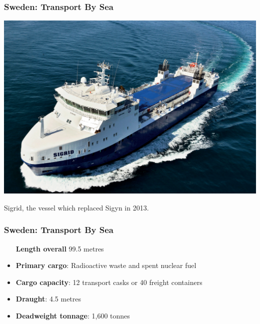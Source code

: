 \begin{frame}[c]
\frametitle{Sweden: Transport By Sea}

\includegraphics[height=0.9\textheight]{./images/sweden-sigrid}


Sigrid, the vessel which replaced Sigyn in 2013.

\end{frame}

\begin{frame}[c]
\frametitle{Sweden: Transport By Sea}
\begin{center}
\begin{itemize}
\item[\textbf{Length overall}] 99.5 metres
                \item \textbf{Primary cargo}: Radioactive waste and spent nuclear fuel
                \item \textbf{Cargo capacity}: 12 transport casks or 40 freight containers
                \item \textbf{Draught}: 4.5 metres
                \item \textbf{Deadweight tonnage}: 1,600 tonnes
        \end{itemize}
\end{center}
\end{frame}
